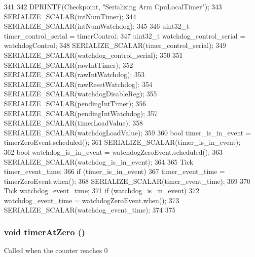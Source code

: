 \begin{DoxyCode}
341 {
342     DPRINTF(Checkpoint, "Serializing Arm CpuLocalTimer\n");
343     SERIALIZE_SCALAR(intNumTimer);
344     SERIALIZE_SCALAR(intNumWatchdog);
345 
346     uint32_t timer_control_serial = timerControl;
347     uint32_t watchdog_control_serial = watchdogControl;
348     SERIALIZE_SCALAR(timer_control_serial);
349     SERIALIZE_SCALAR(watchdog_control_serial);
350 
351     SERIALIZE_SCALAR(rawIntTimer);
352     SERIALIZE_SCALAR(rawIntWatchdog);
353     SERIALIZE_SCALAR(rawResetWatchdog);
354     SERIALIZE_SCALAR(watchdogDisableReg);
355     SERIALIZE_SCALAR(pendingIntTimer);
356     SERIALIZE_SCALAR(pendingIntWatchdog);
357     SERIALIZE_SCALAR(timerLoadValue);
358     SERIALIZE_SCALAR(watchdogLoadValue);
359 
360     bool timer_is_in_event = timerZeroEvent.scheduled();
361     SERIALIZE_SCALAR(timer_is_in_event);
362     bool watchdog_is_in_event = watchdogZeroEvent.scheduled();
363     SERIALIZE_SCALAR(watchdog_is_in_event);
364 
365     Tick timer_event_time;
366     if (timer_is_in_event){
367         timer_event_time = timerZeroEvent.when();
368         SERIALIZE_SCALAR(timer_event_time);
369     }
370     Tick watchdog_event_time;
371     if (watchdog_is_in_event){
372         watchdog_event_time = watchdogZeroEvent.when();
373         SERIALIZE_SCALAR(watchdog_event_time);
374     }
375 }
\end{DoxyCode}
\hypertarget{classCpuLocalTimer_1_1Timer_a84a1ec7607453e04aa1cdada60013803}{
\subsubsection[{timerAtZero}]{\setlength{\rightskip}{0pt plus 5cm}void timerAtZero ()}}
\label{classCpuLocalTimer_1_1Timer_a84a1ec7607453e04aa1cdada60013803}
Called when the counter reaches 0 


